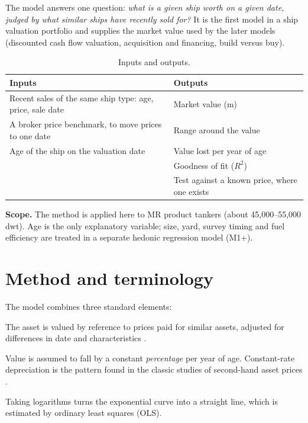 \documentclass[11pt,a4paper]{article}
\newcommand{\usd}[1]{\text{US\$}#1}
\begin{document}
The model answers one question: \emph{what is a given ship worth on a given date, judged by what similar ships have recently sold for?}
It is the first model in a ship valuation portfolio and supplies the market value used by the later models (discounted cash flow valuation, acquisition and financing, build versus buy).

\begin{table}[h]
\centering
\caption{Inputs and outputs.}
\label{tab:io}
\begin{tabularx}{\linewidth}{@{}XX@{}}
\toprule
Inputs & Outputs \\
\midrule
Recent sales of the same ship type: age, price, sale date & Market value (\usd{}m) \\
A broker price benchmark, to move prices to one date & Range around the value \\
Age of the ship on the valuation date & Value lost per year of age \\
 & Goodness of fit ($R^2$) \\
 & Test against a known price, where one exists \\
\bottomrule
\end{tabularx}
\end{table}

\textbf{Scope.} The method is applied here to MR product tankers (about 45,000--55,000 dwt). Age is the only explanatory variable; size, yard, survey timing and fuel efficiency are treated in a separate hedonic regression model (M1+).

\section{Method and terminology}

The model combines three standard elements:

\begin{description}[leftmargin=0pt,font=\normalfont\bfseries]
\item[Comparable sales method (market approach).] The asset is valued by reference to prices paid for similar assets, adjusted for differences in date and characteristics \citep{IVS105}.
\item[Exponential (geometric) depreciation.] Value is assumed to fall by a constant \emph{percentage} per year of age. Constant-rate depreciation is the pattern found in the classic studies of second-hand asset prices \citep{HultenWykoff1981a,HultenWykoff1981b}.
\item[Log-linear regression by ordinary least squares.] Taking logarithms turns the exponential curve into a straight line, which is estimated by ordinary least squares (OLS).
\end{description}
\end{document}
